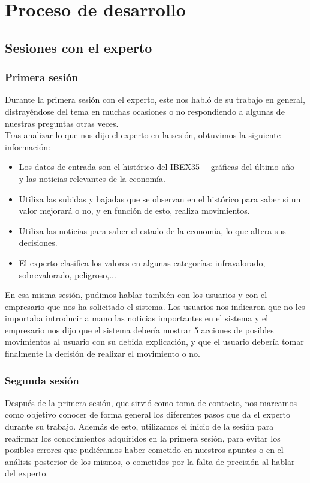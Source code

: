 \section{Proceso de desarrollo}
\subsection{Sesiones con el experto}
\subsubsection{Primera sesión}
Durante la primera sesión con el experto, este nos habló de su trabajo en general, distrayéndose del tema en muchas ocasiones o no respondiendo a algunas de nuestras preguntas otras veces.\\

Tras analizar lo que nos dijo el experto en la sesión, obtuvimos la siguiente información:\\
\begin{itemize}
\item Los datos de entrada son el histórico del IBEX35 ---gráficas del último año--- y las noticias relevantes de la economía.
\item Utiliza las subidas y bajadas que se observan en el histórico para saber si un valor mejorará o no, y en función de esto, realiza movimientos.
\item Utiliza las noticias para saber el estado de la economía, lo que altera sus decisiones.
\item El experto clasifica los valores en algunas categorías: infravalorado, sobrevalorado, peligroso,... 
\end{itemize}

En esa misma sesión, pudimos hablar también con los usuarios y con el empresario que nos ha solicitado el sistema. Los usuarios nos indicaron que no les importaba introducir a mano las noticias importantes en el sistema y el empresario nos dijo que el sistema debería mostrar 5 acciones de posibles movimientos al usuario con su debida explicación, y que el usuario debería tomar finalmente la decisión de realizar el movimiento o no.  

\subsubsection{Segunda sesión}
Después de la primera sesión, que sirvió como toma de contacto, nos marcamos como objetivo conocer de forma general los diferentes pasos que da el experto durante su trabajo. Además de esto, utilizamos el inicio de la sesión para reafirmar los conocimientos adquiridos en la primera sesión, para evitar los posibles errores que pudiéramos haber cometido en nuestros apuntes o en el análisis posterior de los mismos, o cometidos por la falta de precisión al hablar del experto.\\

